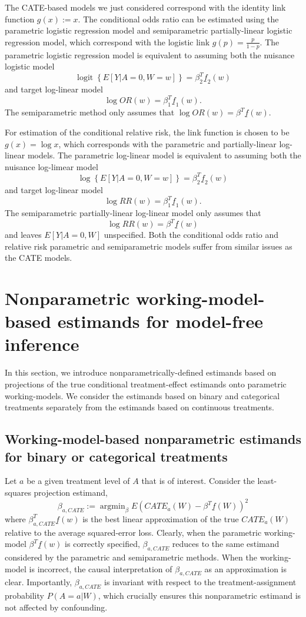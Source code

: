 \documentclass[
]{jss}
\DeclareMathOperator{\logit}{logit}
\DeclareMathOperator{\argmin}{argmin}
\begin{document}
The CATE-based models we just considered correspond with the identity
link function \(g(x) := x\). The conditional odds ratio can be estimated
using the parametric logistic regression model and semiparametric
partially-linear logistic regression model, which correspond with the
logistic link \(g(p) = \frac{p}{1-p}\). The parametric logistic
regression model is equivalent to assuming both the nuisance logistic
model
\[\logit \left\{ E[Y|A=0,W=w] \right\} =  \beta_2^T \underline{f}_2(w) \]
and target log-linear model
\[\log OR(w) = \beta_1^T \underline{f}_1(w).\] The semiparametric method
only assumes that \(\log OR(w) = \beta^T \underline{f}(w).\)

\noindent For estimation of the conditional relative risk, the link
function is chosen to be \(g(x) = \log x\), which corresponds with the
parametric and partially-linear log-linear models. The parametric
log-linear model is equivalent to assuming both the nuisance log-limear
model
\[\log \left\{ E[Y|A=0,W=w] \right\} =  \beta_2^T \underline{f}_2(w) \]
and target log-linear model
\[\log RR(w) = \beta_1^T \underline{f}_1(w).\] The semiparametric
partially-linear log-linear model only assumes that
\[\log RR(w) = \beta^T \underline{f}(w)\] and leaves \(E[Y|A=0,W]\)
unspecified. Both the conditional odds ratio and relative risk
parametric and semiparametric models suffer from similar issues as the
CATE models.

\section{Nonparametric working-model-based estimands for model-free inference}

In this section, we introduce nonparametrically-defined estimands based
on projections of the true conditional treatment-effect estimands onto
parametric working-models. We consider the estimands based on binary and
categorical treatments separately from the estimands based on continuous
treatments.

\subsection{Working-model-based nonparametric estimands for binary or categorical treatments}\label{section::estimandNPcat}

Let \(a\) be a given treatment level of \(A\) that is of interest.
Consider the least-squares projection estimand,
\[\beta_{a,CATE} := \argmin_{\beta} E\left(CATE_a(W) - \beta^T \underline{f}(W) \right)^2\]
where \(\beta_{a,CATE}^T \underline{f}(w)\) is the best linear
approximation of the true \(CATE_a(W)\) relative to the average
squared-error loss. Clearly, when the parametric working-model
\(\beta^T \underline{f}(w)\) is correctly specified, \(\beta_{a,CATE}\)
reduces to the same estimand considered by the parametric and
semiparametric methods. When the working-model is incorrect, the causal
interpretation of \(\beta_{a,CATE}\) as an approximation is clear.
Importantly, \(\beta_{a,CATE}\) is invariant with respect to the
treatment-assignment probability \(P(A=a|W)\), which crucially ensures
this nonparametric estimand is not affected by confounding.
\end{document}
